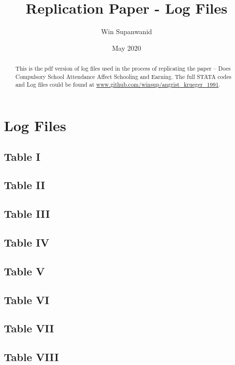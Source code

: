 \documentclass{article}
\title{Replication Paper - Log Files}
\author{Win Supanwanid}
\date{May 2020}
\begin{document}
\renewcommand{\abstractname}{\vspace{-\baselineskip}} %
\maketitle

\begin{abstract}

 This is the pdf version of log files used in the process of replicating the paper -- Does Compulsory School Attendance Affect Schooling and Earning.
The full STATA codes and Log files could be found at \url{www.github.com/winsup/angrist_krueger_1991}.

\end{abstract}

\tableofcontents

\section{Log Files}
\subsection{Table I}
\begin{stlog}\end{stlog}
\clearpage
\subsection{Table II}
\begin{stlog}\end{stlog}
\clearpage
\subsection{Table III}
\begin{stlog}\end{stlog}
\clearpage
\subsection{Table IV}
\begin{stlog}\end{stlog}
\clearpage
\subsection{Table V}
\begin{stlog}\end{stlog}
\clearpage
\subsection{Table VI}
\begin{stlog}\end{stlog}
\clearpage
\subsection{Table VII}
\begin{stlog}\end{stlog}
\clearpage
\subsection{Table VIII}
\begin{stlog}\end{stlog}
\end{document}
